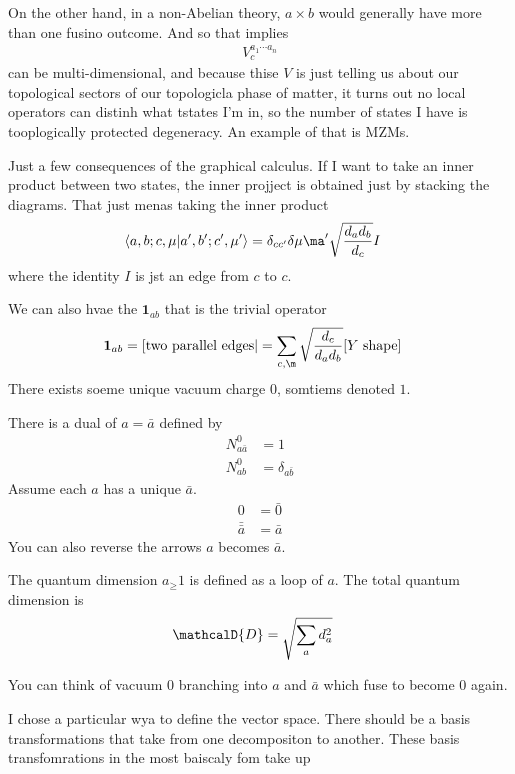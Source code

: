 On the other hand,
in a non-Abelian theory,
$a\times b$ would generally have more than one fusino outcome.
And so that implies
\begin{align}
    V_{c}^{a_1\cdots a_n}
\end{align}
can be multi-dimensional,
and because thise $V$ is just telling us about our topological sectors of our
topologicla phase of matter,
it turns out no local operators can distinh what tstates I'm in,
so the number of states I have is tooplogically protected degeneracy.
An example of that is MZMs.


Just a few consequences of the graphical calculus.
If I want to take an inner product between two states,
the inner projject is obtained just by stacking the diagrams.
That just menas taking the inner product
\begin{align}
    \braket{a,b;c,\mu}{a',b';c',\mu'}
    &=
    \delta_{cc'}
    \delta{\mu\ma'}
    \sqrt{\frac{d_a d_b}{d_c}}
    I
\end{align}
where the identity $I$ is jst an edge from $c$ to $c$.

We can also hvae the $\mathbf{1}_{ab}$
that is the trivial operator 
\begin{align}
    \mathbf{1}_{ab}
    &=
    [\text{two parallel edges}|
    =
    \sum_{c,\m} \sqrt{\frac{d_c}{d_a d_b}} [Y\text{ shape}]
\end{align}
There exists soeme unique vacuum charge 0,
somtiems denoted $1$.

There is a dual of $a=\bar{a}$ defined by
\begin{align}
    N_{a\bar{a}}^{0} &= 1\\
    N_{ab}^{0} &= \delta_{a\bar{b}}
\end{align}
Assume each $a$ has a unique $\bar{a}$.
\begin{align}
    0 &= \bar{0}\\
    \bar{\bar{a}} &= \bar{a}
\end{align}
You can also reverse the arrows $a$ becomes $\bar{a}$.

The quantum dimension $a_ \ge 1$ is defined as a loop of $a$.
The total quantum dimension is
\begin{align}
    \mathcalD{D}
    &=
    \sqrt{\sum_a d_a^2}
\end{align}

You can think of vacuum $0$ branching into $a$ and $\bar{a}$ which fuse to
become $0$ again.

I chose a particular wya to define the vector space.
There should be a basis transformations that take from one decompositon to
another.
These basis transfomrations in the most baiscaly fom take up

